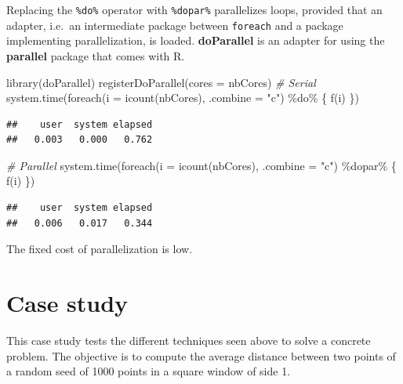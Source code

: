 \documentclass[
  12pt,
  american,
  a4paper,
  extrafontsizes,onecolumn,openright
  ]{memoir}
\newenvironment{Shaded}{\begin{snugshade}}{\end{snugshade}}
\newcommand{\AttributeTok}[1]{\textcolor[rgb]{0.77,0.63,0.00}{#1}}
\newcommand{\CommentTok}[1]{\textcolor[rgb]{0.56,0.35,0.01}{\textit{#1}}}
\newcommand{\FunctionTok}[1]{\textcolor[rgb]{0.00,0.00,0.00}{#1}}
\newcommand{\NormalTok}[1]{#1}
\newcommand{\SpecialCharTok}[1]{\textcolor[rgb]{0.00,0.00,0.00}{#1}}
\newcommand{\StringTok}[1]{\textcolor[rgb]{0.31,0.60,0.02}{#1}}
\begin{document}
Replacing the \texttt{\%do\%} operator with \texttt{\%dopar\%} parallelizes loops, provided that an adapter, i.e.~an intermediate package between \texttt{foreach} and a package implementing parallelization, is loaded.
\textbf{doParallel} is an adapter for using the \textbf{parallel} package that comes with R.

\scriptsize

\begin{Shaded}
\begin{Highlighting}[]
\FunctionTok{library}\NormalTok{(doParallel)}
\FunctionTok{registerDoParallel}\NormalTok{(}\AttributeTok{cores =}\NormalTok{ nbCores)}
\CommentTok{\# Serial}
\FunctionTok{system.time}\NormalTok{(}\FunctionTok{foreach}\NormalTok{(}\AttributeTok{i =} \FunctionTok{icount}\NormalTok{(nbCores), }\AttributeTok{.combine =} \StringTok{"c"}\NormalTok{) }\SpecialCharTok{\%do\%}
\NormalTok{    \{}
        \FunctionTok{f}\NormalTok{(i)}
\NormalTok{    \})}
\end{Highlighting}
\end{Shaded}

\begin{verbatim}
##    user  system elapsed 
##   0.003   0.000   0.762
\end{verbatim}

\begin{Shaded}
\begin{Highlighting}[]
\CommentTok{\# Parallel}
\FunctionTok{system.time}\NormalTok{(}\FunctionTok{foreach}\NormalTok{(}\AttributeTok{i =} \FunctionTok{icount}\NormalTok{(nbCores), }\AttributeTok{.combine =} \StringTok{"c"}\NormalTok{) }\SpecialCharTok{\%dopar\%}
\NormalTok{    \{}
        \FunctionTok{f}\NormalTok{(i)}
\NormalTok{    \})}
\end{Highlighting}
\end{Shaded}

\begin{verbatim}
##    user  system elapsed 
##   0.006   0.017   0.344
\end{verbatim}

\normalsize

The fixed cost of parallelization is low.

\hypertarget{sec:cas}{%
\section{Case study}\label{sec:cas}}

This case study tests the different techniques seen above to solve a concrete problem.
The objective is to compute the average distance between two points of a random seed of 1000 points in a square window of side 1.
\end{document}
